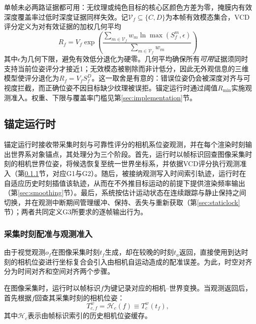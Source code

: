 \documentclass[review]{vgtc}
\begin{document}
单帧未必两路证据都可用：无纹理或纯色目标的核心区颜色方差为零，掩膜内有效深度覆盖率过低时深度证据同样失效。记$\mathcal{V}_f \subseteq \{C, D\}$为本帧有效模态集合，VCD评分定义为对有效证据的加权几何平均
\begin{equation}
R_f = V_f \exp\!\left(\frac{\sum_{m \in \mathcal{V}_f} w_m \ln \max(S_f^{m}, \epsilon)}{\sum_{m \in \mathcal{V}_f} w_m}\right)
\label{eq:vcd}
\end{equation}
其中$\epsilon$为几何下限，避免有效低分退化为硬零。几何平均确保所有\emph{可用}证据须同时支持当前位姿评分才接近1；无效模态被剔除而非计低分，因此无外观信息的三维模型使评分退化为$R_f = V_f S_f^D$。这一取舍是有意的：错误位姿仍会被深度对齐与可视度拦截，而正确位姿不因目标缺少纹理被误拒。锚定运行时通过阈值$R_{\min}$实施观测准入。权重、下限与覆盖率门槛见第\ref{sec:implementation}节。

\subsection{锚定运行时}\label{sec:anchoring}

锚定运行时接收带采集时刻与可靠性评分的相机系位姿观测，并在每个渲染时刻输出世界系对象锚点，其处理分为三个阶段。首先，运行时以帧标识回查图像采集时刻的相机世界位姿，将候选恢复至统一世界坐标系，并依据VCD评分执行观测准入（第\ref{sec:alignment}节，对应G1与G2）。随后，被接纳观测写入时间索引轨迹，运行时在自适应历史时刻插值该轨迹，从而在不外推目标运动的前提下提供渲染频率输出（第\ref{sec:smoothing}节）。最后，系统按估计运动状态在连续跟踪与静止保持之间切换，并在观测中断期间管理缓冲、保持、丢失与重新获取（第\ref{sec:staticlock}节）；两者共同定义G3所要求的逐帧输出行为。

\subsubsection{采集时刻配准与观测准入}\label{sec:alignment}

由于视觉观测$o_f$在图像采集时刻$t_f$生成，却在较晚的时刻$t_a$返回，直接使用到达时刻的相机位姿进行坐标复合会引入由相机自运动造成的配准误差。为此，时空对齐分为时间对齐和空间对齐两个步骤。

在图像采集时，运行时以帧标识$f$为键记录对应的相机--世界变换。当观测返回后，首先根据$f$回查其采集时刻的相机位姿：
\begin{equation}
T_{c,f}^{w}
=
\mathcal{H}_c(f)
\equiv
T_c^w(t_f),
\label{eq:temporal-alignment}
\end{equation}
其中$\mathcal{H}_c$表示由帧标识索引的历史相机位姿缓存。
\end{document}
